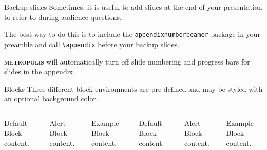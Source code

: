 \documentclass[10pt]{beamer}
\newcommand{\themename}{\textbf{\textsc{metropolis}}\xspace}
\begin{document}
\begin{frame}[fragile]{Backup slides}
  Sometimes, it is useful to add slides at the end of your presentation to
  refer to during audience questions.

  The best way to do this is to include the \verb|appendixnumberbeamer|
  package in your preamble and call \verb|\appendix| before your backup slides.

  \themename will automatically turn off slide numbering and progress bars for
  slides in the appendix.
\end{frame}

\begin{frame}{Blocks}
  Three different block environments are pre-defined and may be styled with an
  optional background color.

  \begin{columns}[T,onlytextwidth]
      \begin{block}{Default}
        Block content.
      \end{block}

      \begin{alertblock}{Alert}
        Block content.
      \end{alertblock}

      \begin{exampleblock}{Example}
        Block content.
      \end{exampleblock}



      \begin{block}{Default}
        Block content.
      \end{block}

      \begin{alertblock}{Alert}
        Block content.
      \end{alertblock}

      \begin{exampleblock}{Example}
        Block content.
      \end{exampleblock}

  \end{columns}
\end{frame}
\end{document}
